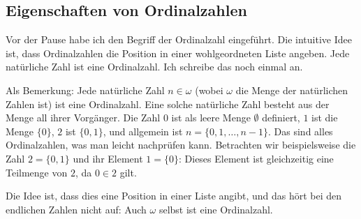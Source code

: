\begin{math-stroke}
\end{math-stroke}

\subsection{Eigenschaften von Ordinalzahlen}

\begin{spoken-clean}[00:45:48 - 00:47:38]
Vor der Pause habe ich den Begriff der Ordinalzahl eingeführt. Die intuitive Idee ist, dass Ordinalzahlen die Position in einer wohlgeordneten Liste angeben. Jede natürliche Zahl ist eine Ordinalzahl. Ich schreibe das noch einmal an.

Als Bemerkung: Jede natürliche Zahl $n \in \omega$ (wobei $\omega$ die Menge der natürlichen Zahlen ist) ist eine Ordinalzahl. Eine solche natürliche Zahl besteht aus der Menge all ihrer Vorgänger. Die Zahl $0$ ist als leere Menge $\emptyset$ definiert, $1$ ist die Menge $\{0\}$, $2$ ist $\{0, 1\}$, und allgemein ist $n = \{0, 1, \dots, n-1\}$. Das sind alles Ordinalzahlen, was man leicht nachprüfen kann. Betrachten wir beispielsweise die Zahl $2 = \{0, 1\}$ und ihr Element $1 = \{0\}$: Dieses Element ist gleichzeitig eine Teilmenge von $2$, da $0 \in 2$ gilt.

Die Idee ist, dass dies eine Position in einer Liste angibt, und das hört bei den endlichen Zahlen nicht auf: Auch $\omega$ selbst ist eine Ordinalzahl.
\end{spoken-clean}

\begin{math-stroke}
\end{math-stroke}

